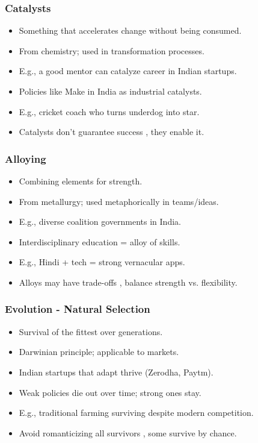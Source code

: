 \begin{frame}[fragile]\frametitle{Catalysts}
  \begin{itemize}
    \item Something that accelerates change without being consumed.
    \item From chemistry; used in transformation processes.
    \item E.g., a good mentor can catalyze career in Indian startups.
    \item Policies like Make in India as industrial catalysts.
    \item E.g., cricket coach who turns underdog into star.
    \item Catalysts don't guarantee success , they enable it.
  \end{itemize}
\end{frame}

\begin{frame}[fragile]\frametitle{Alloying}
  \begin{itemize}
    \item Combining elements for strength.
    \item From metallurgy; used metaphorically in teams/ideas.
    \item E.g., diverse coalition governments in India.
    \item Interdisciplinary education = alloy of skills.
    \item E.g., Hindi + tech = strong vernacular apps.
    \item Alloys may have trade-offs , balance strength vs. flexibility.
  \end{itemize}
\end{frame}

\begin{frame}[fragile]\frametitle{Evolution - Natural Selection}
  \begin{itemize}
    \item Survival of the fittest over generations.
    \item Darwinian principle; applicable to markets.
    \item Indian startups that adapt thrive (Zerodha, Paytm).
    \item Weak policies die out over time; strong ones stay.
    \item E.g., traditional farming surviving despite modern competition.
    \item Avoid romanticizing all survivors , some survive by chance.
  \end{itemize}
\end{frame}

